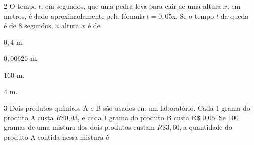 {{{{%

\num{2}  O tempo $t$, em segundos, que uma pedra leva para cair de uma altura $x$,
em metros, é dado aproximadamente pela fórmula $t = 0,05$x. Se o tempo $t$
da queda é de $8$ segundos, a altura $x$ é de

\begin{escolha}
\item $0,4$ m.
\item $0,00625$ m.
\item $160$ m.
\item $4$ m.
\end{escolha}



\num{3}  Dois produtos químicos A e B são usados em um laboratório. Cada $1$ grama
do produto A custa $R\$ 0,03$, e cada $1$ grama do produto B custa R\$ 0,05.
Se $100$ gramas de uma mistura dos dois produtos custam $R\$ 3,60$, a
quantidade do produto A contida nessa mistura é

}}}}
